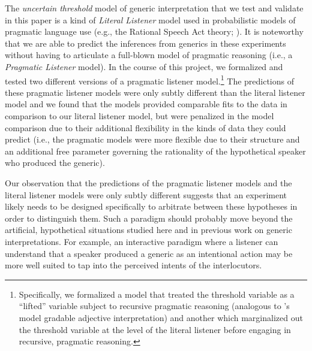 \documentclass[floatsintext,man]{apa6}
\let\rmarkdownfootnote\footnote%
\def\footnote{\protect\rmarkdownfootnote}
\begin{document}
The \emph{uncertain threshold} model of generic interpretation that we test and validate in this paper is a kind of \emph{Literal Listener} model used in probabilistic models of pragmatic language use (e.g., the Rational Speech Act theory; ). 
It is noteworthy that we are able to predict the inferences from generics in these experiments without having to articulate a full-blown model of pragmatic reasoning (i.e., a \emph{Pragmatic Listener} model). 
In the course of this project, we formalized and tested two different versions of a pragmatic listener model.\footnote{Specifically, we formalized a model that treated the threshold variable as a ``lifted'' variable subject to recursive pragmatic reasoning (analogous to 's model gradable adjective interpretation) and another which marginalized out the threshold variable at the level of the literal listener before engaging in recursive, pragmatic reasoning.}
The predictions of these pragmatic listener models were only subtly different than the literal listener model and we found that the models provided comparable fits to the data in comparison to our literal listener model, but were penalized in the model comparison due to their additional flexibility in the kinds of data they could predict (i.e., the pragmatic models were more flexible due to their structure and an additional free parameter governing the rationality of the hypothetical speaker who produced the generic). 

Our observation that the predictions of the pragmatic listener models and the literal listener models were only subtly different suggests that an experiment likely needs to be designed specifically to arbitrate between these hypotheses in order to distinguish them.
Such a paradigm should probably move beyond the artificial, hypothetical situations studied here and in previous work on generic interpretations. 
For example, an interactive paradigm where a listener can understand that a speaker produced a generic as an intentional action may be more well suited to tap into the perceived intents of the interlocutors. 




\end{document}
